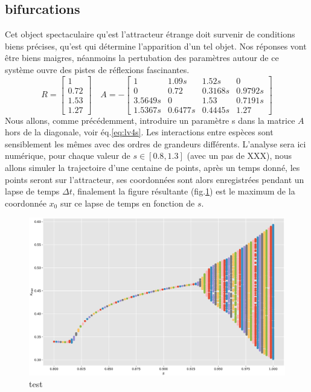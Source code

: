 \documentclass{wsdcr}
\begin{document}
\subsection{bifurcations}
Cet object spectaculaire qu'est l'attracteur étrange doit survenir de conditions biens précises, qu'est qui détermine l'apparition d'un tel objet. Nos réponses vont être biens maigres, néanmoins la pertubation des paramètres autour de ce système ouvre des pistes de réflexions fascinantes.
\begin{equation}
R={\begin{bmatrix}1\\0.72\\1.53\\1.27\end{bmatrix}}\quad A =-{\begin{bmatrix}1&1.09s&1.52s&0\\0&0.72&0.3168s&0.9792s\\3.5649s&0&1.53&0.7191s\\1.5367s&0.6477s&0.4445s&1.27\end{bmatrix}}
\label{eq:lv4s}
\end{equation}
Nous allons, comme précédemment, introduire un paramètre s dans la matrice $A$ hors de la diagonale, voir éq.\ref{eq:lv4s}. Les interactions entre espèces sont sensiblement les mêmes avec des ordres de grandeurs différents. L'analyse sera ici numérique, pour chaque valeur de $s\in [0.8,1.3]$ (avec un pas de XXX), nous allons simuler la trajectoire d'une centaine de points, après un temps donné, les points seront sur l'attracteur, ses coordonnées sont alors enregistrées pendant un lapse de temps $\Delta t$, finalement la figure résultante (fig.\ref{fig:bif4}) est le maximum de la coordonnée $x_0$ sur ce lapse de temps en fonction de $s$. 
\begin{figure}
    \centering
    \includegraphics[width=\linewidth]{fig/lv4_bif.eps}
    \caption{test}
    \label{fig:bif4}
\end{figure}
\end{document}
